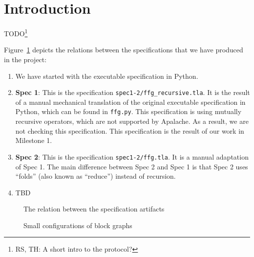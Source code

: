 
\section{Introduction}

TODO\footnote{RS, TH: A short intro to the protocol?}

Figure~\ref{fig:artifacts} depicts the relations between the specifications
that we have produced in the project:

\begin{enumerate}
    \item We have started with the executable specification in Python.

    \item \textbf{Spec 1}: This is the specification
        \texttt{spec1-2/ffg\_recursive.tla}. It is the result of a manual
        mechanical translation of the original executable specification in
        Python, which can be found in \texttt{ffg.py}. This specification is
        using mutually recursive operators, which are not supported by
        Apalache. As a result, we are not checking this specification. This
        specification is the result of our work in Milestone 1.

    \item \textbf{Spec 2}: This is the specification \texttt{spec1-2/ffg.tla}. It
        is a manual adaptation of Spec 1. The main difference between Spec 2
        and Spec 1 is that Spec 2 uses ``folds'' (also known as ``reduce'')
        instead of recursion.

    \item TBD

\end{enumerate}

\begin{figure}
  
  \caption{The relation between the specification artifacts}\label{fig:artifacts}
\end{figure}

\begin{figure}
  
  \caption{Small configurations of block graphs}\label{fig:block-graphs}
\end{figure}

